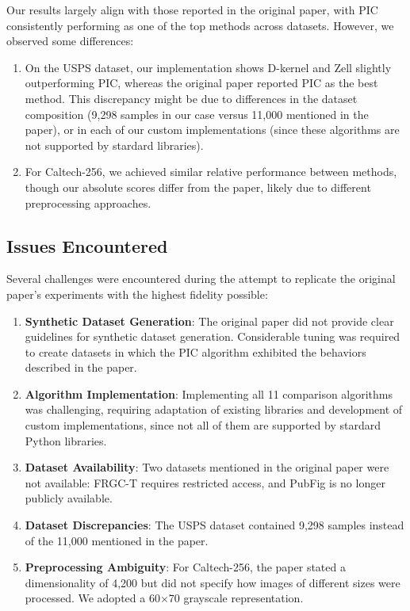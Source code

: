 Our results largely align with those reported in the original paper, with PIC consistently performing as one of the top methods across datasets. However, we observed some differences:

\begin{enumerate}
    \item On the USPS dataset, our implementation shows D-kernel and Zell slightly outperforming PIC, whereas the original paper reported PIC as the best method. This discrepancy might be due to differences in the dataset composition (9,298 samples in our case versus 11,000 mentioned in the paper), or in each of our custom implementations (since these algorithms are not supported by stardard libraries).
    
    \item For Caltech-256, we achieved similar relative performance between methods, though our absolute scores differ from the paper, likely due to different preprocessing approaches.
\end{enumerate}

\subsection{Issues Encountered}
Several challenges were encountered during the attempt to replicate the original paper's experiments with the highest fidelity possible:

\begin{enumerate}
    \item \textbf{Synthetic Dataset Generation}: The original paper did not provide clear guidelines for synthetic dataset generation. Considerable tuning was required to create datasets in which the PIC algorithm exhibited the behaviors described in the paper.
    
    \item \textbf{Algorithm Implementation}: Implementing all 11 comparison algorithms was challenging, requiring adaptation of existing libraries and development of custom implementations, since not all of them are supported by stardard Python libraries.
    
    \item \textbf{Dataset Availability}: Two datasets mentioned in the original paper were not available: FRGC-T requires restricted access, and PubFig is no longer publicly available.
    
    \item \textbf{Dataset Discrepancies}: The USPS dataset contained 9,298 samples instead of the 11,000 mentioned in the paper.
    
    \item \textbf{Preprocessing Ambiguity}: For Caltech-256, the paper stated a dimensionality of 4,200 but did not specify how images of different sizes were processed. We adopted a 60$\times$70 grayscale representation.
\end{enumerate}


